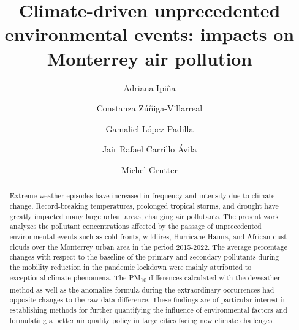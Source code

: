 \documentclass[preprint,12pt]{elsarticle}
\begin{document}
\begin{frontmatter}
	\title{
 Climate-driven unprecedented environmental events: impacts on Monterrey air pollution
	}
	\author[1]{Adriana Ipiña}
	\author[2]{Constanza Zúñiga-Villarreal}
	\author[3]{Gamaliel López-Padilla}
	\author[4]{Jair Rafael Carrillo Ávila}
	\author[5]{Michel Grutter}
	\vspace{-1em}
	\begin{abstract}
 Extreme weather episodes have increased in frequency and intensity due to climate change. Record-breaking temperatures, prolonged tropical storms, and drought have greatly impacted many large urban areas, changing air pollutants. The present work analyzes the pollutant concentrations affected by the passage of unprecedented environmental events such as cold fronts, wildfires, Hurricane Hanna, and African dust clouds over the Monterrey urban area in the period 2015-2022. The average percentage changes with respect to the baseline of the primary and secondary pollutants during the mobility reduction in the pandemic lockdown were mainly attributed to exceptional climate phenomena. The PM\textsubscript{10} differences calculated with the deweather method as well as the anomalies formula during the extraordinary occurrences had opposite changes to the raw data difference. These findings are of particular interest in establishing methods for further quantifying the influence of environmental factors and formulating a better air quality policy in large cities facing new climate challenges.

\end{abstract}
\end{frontmatter}
\end{document}
